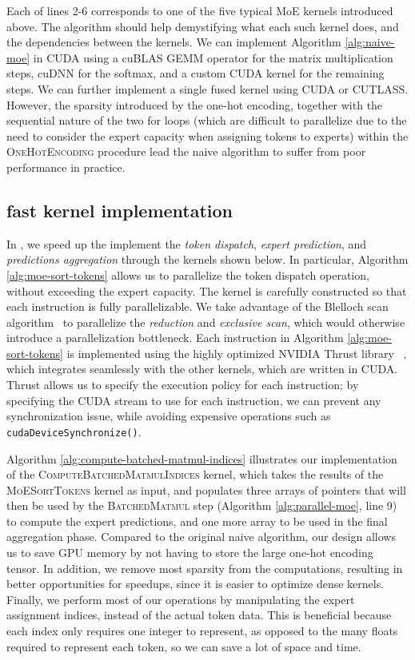 Each of lines 2-6 corresponds to one of the five typical MoE kernels introduced above. The algorithm should help demystifying what each such kernel does, and the dependencies between the kernels. We can implement Algorithm \ref{alg:naive-moe} in CUDA using a cuBLAS GEMM operator for the matrix multiplication steps, cuDNN for the softmax, and a custom CUDA kernel for the remaining steps. We can further implement a single fused kernel using CUDA or CUTLASS. However, the sparsity introduced by the one-hot encoding, together with the sequential nature of the two for loops (which are difficult to parallelize due to the need to consider the expert capacity when assigning tokens to experts) within the \textsc{OneHotEncoding} procedure lead the naive algorithm to suffer from poor performance in practice.

\subsection{\Project fast kernel implementation}
In \Project, we speed up the implement the \textit{token dispatch}, \textit{expert prediction}, and \textit{predictions aggregation} through the kernels shown below. In particular, Algorithm \ref{alg:moe-sort-tokens} allows us to parallelize the token dispatch operation, without exceeding the expert capacity. The kernel is carefully constructed so that each instruction is fully parallelizable. We take advantage of the Blelloch scan algorithm~\cite{blelloch_prefix_1990} to parallelize the \textit{reduction} and \textit{exclusive scan}, which would otherwise introduce a parallelization bottleneck. Each instruction in Algorithm \ref{alg:moe-sort-tokens} is implemented using the highly optimized NVIDIA Thrust library ~\cite{thrust}, which integrates seamlessly with the other kernels, which are written in CUDA. Thrust allows us to specify the execution policy for each instruction; by specifying the CUDA stream to use for each instruction, we can prevent any synchronization issue, while avoiding expensive operations such as \texttt{cudaDeviceSynchronize()}.

Algorithm \ref{alg:compute-batched-matmul-indices} illustrates our implementation of the \textsc{ComputeBatchedMatmulIndices} kernel, which takes the results of the \textsc{MoESortTokens} kernel as input, and populates three arrays of pointers that will then be used by the \textsc{BatchedMatmul} step (Algorithm \ref{alg:parallel-moe}, line 9) to compute the expert predictions, and one more array to be used in the final aggregation phase. Compared to the original naive algorithm, our design allows us to save GPU memory by not having to store the large one-hot encoding tensor. In addition, we remove most sparsity from the computations, resulting in better opportunities for speedups, since it is easier to optimize dense kernels. Finally, we perform most of our operations by manipulating the expert assignment indices, instead of the actual token data. This is beneficial because each index only requires one integer to represent, as opposed to the many floats required to represent each token, so we can save a lot of space and time. 

